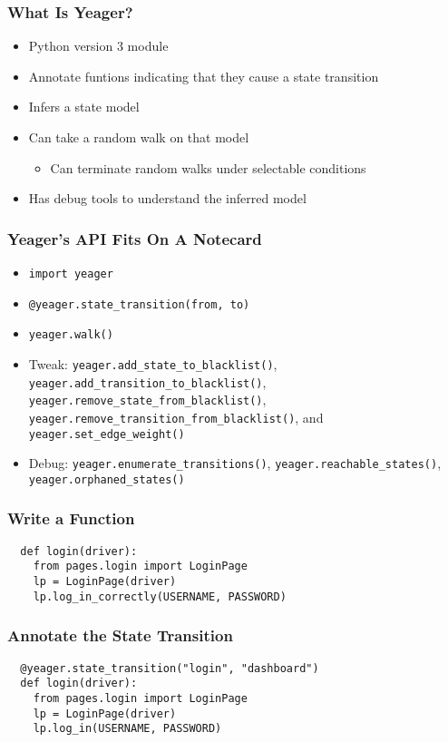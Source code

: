 \begin{frame}
  \frametitle{What Is Yeager?}
  \begin{itemize}
    \item Python version 3 module
    \item Annotate funtions indicating that they cause a state transition
    \item Infers a state model
    \item Can take a random walk on that model
    \begin{itemize}
      \item Can terminate random walks under selectable conditions
    \end{itemize}
    \item Has debug tools to understand the inferred model
  \end{itemize}
\end{frame}

\begin{frame}
  \frametitle{Yeager's API Fits On A Notecard}
  \begin{itemize}
    \item \texttt{import yeager}
    \item \texttt{@yeager.state\_transition(from, to)}
    \item \texttt{yeager.walk()}
    \item Tweak: \texttt{yeager.add\_state\_to\_blacklist()}, \texttt{yeager.add\_transition\_to\_blacklist()}, \texttt{yeager.remove\_state\_from\_blacklist()}, \texttt{yeager.remove\_transition\_from\_blacklist()}, and \texttt{yeager.set\_edge\_weight()}
    \item Debug: \texttt{yeager.enumerate\_transitions()}, \texttt{yeager.reachable\_states()}, \texttt{yeager.orphaned\_states()}
  \end{itemize}
\end{frame}

\begin{frame}[fragile]
  \frametitle{Write a Function}
  \begin{lstlisting}
  def login(driver):
    from pages.login import LoginPage
    lp = LoginPage(driver)
    lp.log_in_correctly(USERNAME, PASSWORD)
  \end{lstlisting}
\end{frame}

\begin{frame}[fragile]
  \frametitle{Annotate the State Transition}
  \begin{lstlisting}
  @yeager.state_transition("login", "dashboard")
  def login(driver):
    from pages.login import LoginPage
    lp = LoginPage(driver)
    lp.log_in(USERNAME, PASSWORD)
  \end{lstlisting}
\end{frame}

